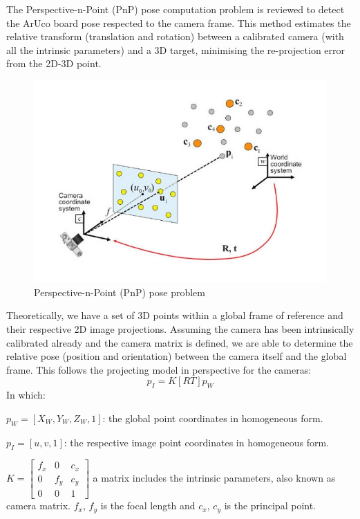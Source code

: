 The Perspective-n-Point (PnP) pose computation problem is reviewed to detect the ArUco board pose respected to the camera frame. This method estimates the relative transform (translation and rotation) between a calibrated camera (with all the intrinsic parameters) and a 3D target, minimising the re-projection error from the 2D-3D point.
\clearpage

\begin{figure}[ht]
\centering
\includegraphics[width=1\textwidth]{Images/Perspective-n-Point (PnP) pose problem.jpg}
\caption{Perspective-n-Point (PnP) pose problem}
\end{figure}

Theoretically, we have a set of 3D points within a global frame of reference and their respective 2D image projections. Assuming the camera has been intrinsically calibrated already and the camera matrix is defined, we are able to determine the relative pose (position and orientation) between the camera itself and the global frame. This follows the projecting model in perspective for the cameras:
\[
p_{I}=K[RT]p_{W}
\]
In which:

$p_{W}=[X_{W}, Y_{W}, Z_{W}, 1]$: the global point coordinates in homogeneous form.

$p_{I}=[u,v,1]$: the respective image point coordinates in homogeneous form.

$
K=
\begin{bmatrix}
    f_{x} &  0      & c_{x} \\
    0     &  f_{y}  & c_{y} \\
    0     &  0      & 1
\end{bmatrix}
$
a matrix includes the intrinsic parameters, also known as camera matrix. $f_{x}$, $f_{y}$ is the focal length and $c_{x}$, $c_{y}$ is the principal point.

